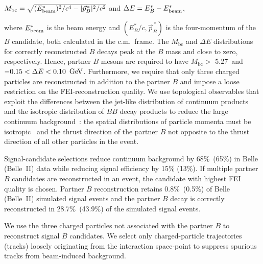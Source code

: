 $M_{\mathrm{bc}} = \sqrt{(E^*_{\rm beam})^2/c^4 - |\vec{p}^{\, *}_{B}|^2/c^2}$ and
 $\Delta E  = E^*_{B} -  E^*_{\rm beam}$,

where $E^*_{\rm beam}$ is the beam energy and $(E^*_{B}/c,\vec{p}^{\,*}_{B})$ is the four-momentum of the $B$ candidate, both calculated in the c.m.\ frame. The $M_{\mathrm{bc}}$ and $\Delta E$ distributions for correctly reconstructed $B$ decays peak at the $B$ mass and close to zero, respectively.
Hence, partner $B$ mesons are required to have $M_{\mathrm{bc}}  > $ 5.27~\gevcc and $-0.15  < \Delta E < 0.10~\mathrm{\,Ge\kern -0.1em V}$. Furthermore, we require that only three charged particles are reconstructed in addition to the partner $B$ and impose a loose restriction on the FEI-reconstruction quality.
We use topological observables that exploit the differences between the jet-like distribution of continuum products and the isotropic distribution of $B\overline{B}$ decay products to reduce the large
continuum background~\cite{BaBar:2014omp}: the spatial distributions of particle momenta must be isotropic~\cite{Bjorken:1969wi} and the thrust direction of the partner $B$ not opposite to the thrust direction of all other particles in the event.

Signal-candidate selections reduce continuum background by 68\%~(65\%) in Belle (Belle~II) data while reducing signal efficiency by 15\% (13\%). If multiple partner $B$ candidates are reconstructed in an event, the candidate with highest FEI quality is chosen. Partner $B$ reconstruction retains 0.8\%~(0.5\%) of Belle (Belle~II) simulated signal events and the partner $B$ decay is correctly reconstructed in 28.7\%~(43.9\%) of the simulated signal events.



We use the three charged particles not associated with the partner $B$ to reconstruct signal $B$ candidates. We select only charged-particle trajectories (tracks) loosely originating from the interaction space-point to suppress spurious tracks from beam-induced background.

